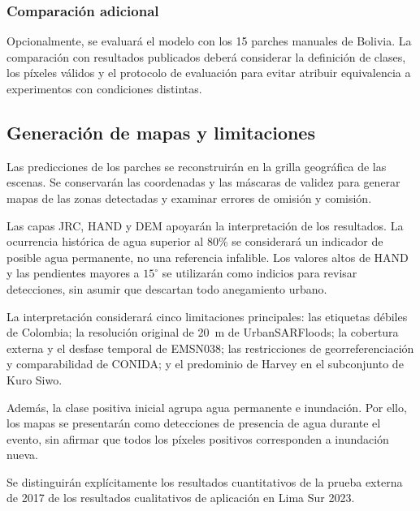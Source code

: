 \documentclass[conference]{IEEEtran}
\begin{document}
\subsubsection{Comparación adicional}

Opcionalmente, se evaluará el modelo con
los 15 parches manuales de Bolivia.
La comparación con resultados publicados
deberá considerar la definición de clases,
los píxeles válidos y el protocolo de evaluación
para evitar atribuir equivalencia a experimentos
con condiciones distintas.

\subsection{Generación de mapas y limitaciones}
\label{subsec:mapas}

Las predicciones de los parches se reconstruirán
en la grilla geográfica de las escenas.
Se conservarán las coordenadas y las máscaras
de validez para generar mapas de las zonas
detectadas y examinar errores de omisión
y comisión.

Las capas JRC, HAND y DEM apoyarán
la interpretación de los resultados.
La ocurrencia histórica de agua superior
al 80\% se considerará un indicador de
posible agua permanente, no una referencia
infalible. Los valores altos de HAND
y las pendientes mayores a $15^{\circ}$
se utilizarán como indicios para revisar
detecciones, sin asumir que descartan
todo anegamiento urbano.

La interpretación considerará cinco
limitaciones principales: las etiquetas
débiles de Colombia; la resolución original
de 20~m de UrbanSARFloods; la cobertura
externa y el desfase temporal de EMSN038;
las restricciones de georreferenciación
y comparabilidad de CONIDA; y el predominio
de Harvey en el subconjunto de Kuro Siwo.

Además, la clase positiva inicial agrupa
agua permanente e inundación. Por ello,
los mapas se presentarán como detecciones
de presencia de agua durante el evento,
sin afirmar que todos los píxeles positivos
corresponden a inundación nueva.

Se distinguirán explícitamente los resultados
cuantitativos de la prueba externa de 2017
de los resultados cualitativos de aplicación
en Lima Sur 2023.

\end{document}
